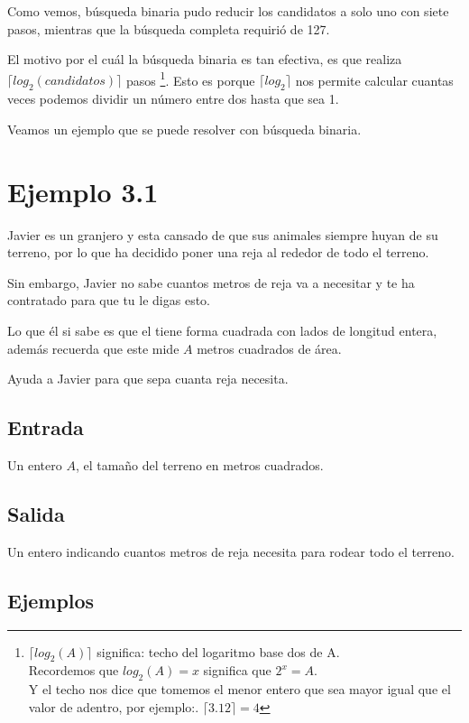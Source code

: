 Como vemos, búsqueda binaria pudo reducir los candidatos a solo uno con siete pasos, mientras que la búsqueda completa requirió de 127.

El motivo por el cuál la búsqueda binaria es tan efectiva, es que realiza \(\lceil log_2(candidatos) \rceil\) pasos \footnote{\(\lceil log_2(A) \rceil \) significa: techo del logaritmo base dos de A.\\ Recordemos que \(log_2(A)=x\) significa que \(2^x=A\).\\ Y el techo nos dice que tomemos el menor entero que sea mayor igual que el valor de adentro, por ejemplo:. \(\lceil 3.12 \rceil =4\)}. Esto es porque \(\lceil log_2 \rceil \) nos permite calcular cuantas veces podemos dividir un número entre dos hasta que sea 1.

Veamos un ejemplo que se puede resolver con búsqueda binaria.

\section*{Ejemplo 3.1}

Javier es un granjero y esta cansado de que sus animales siempre huyan de su terreno, por lo que ha decidido poner una reja al rededor de todo el terreno.

Sin embargo, Javier no sabe cuantos metros de reja va a necesitar y te ha contratado para que tu le digas esto. 

Lo que él si sabe es que el tiene forma cuadrada con lados de longitud entera, además recuerda que este mide \(A\) metros cuadrados de área.

Ayuda a Javier para que sepa cuanta reja necesita.

\subsection*{Entrada}
Un entero \(A\), el tamaño del terreno en metros cuadrados.
\subsection*{Salida}
Un entero indicando cuantos metros de reja necesita para rodear todo el terreno. 

\subsection*{Ejemplos}
\begin{casebox2}
\end{casebox2}

